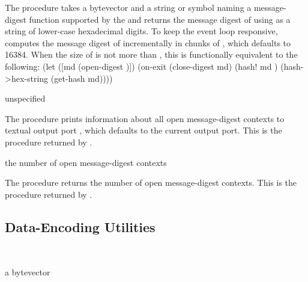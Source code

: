 The  procedure takes a bytevector  and a
string or symbol  naming a message-digest function supported by the
 and returns the message digest of 
using  as a string of lower-case hexadecimal digits.
To keep the event loop responsive,  computes
the message digest of  incrementally in chunks of ,
which defaults to 16384.
When the size of  is not more than , this is
functionally equivalent to the following:
\codebegin
(let ([md (open-digest )])
  (on-exit (close-digest md)
    (hash! md )
    (hash->hex-string (get-hash md))))
\codeend

\begin{procedure}
\end{procedure}
\returns{} unspecified

The  procedure prints information about all open
message-digest contexts to textual output port , which defaults to the
current output port.
This is the procedure returned by .

\begin{procedure}
\end{procedure}
\returns{} the number of open message-digest contexts

The  procedure returns the number of open
message-digest contexts.
This is the procedure returned by .

\subsection{Data-Encoding Utilities}

\begin{procedure}
  \strut\\
  \strut
\end{procedure}
\returns{} a bytevector


